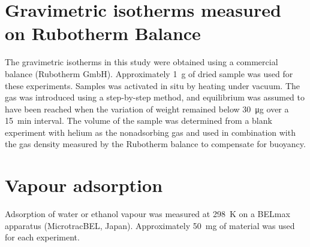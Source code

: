 \section{Gravimetric isotherms measured on Rubotherm Balance}

The gravimetric isotherms in this study were obtained 
using a commercial balance (Rubotherm GmbH). Approximately 
\SI{1}{\gram} of dried sample was used for these experiments. Samples was activated
in situ by heating under vacuum. 
The gas was introduced using a step-by-step method, and equilibrium was
assumed to have been reached when the variation of weight remained
below \SI{30}{\micro\gram} over a \SI{15}{\minute} interval. The volume of the sample was
determined from a blank experiment with helium as the nonadsorbing
gas and used in combination with the gas density measured by the
Rubotherm balance to compensate for buoyancy.

\section{Vapour adsorption}

Adsorption of water or ethanol vapour was measured at \SI{298}{\kelvin} on a BELmax apparatus
(MicrotracBEL, Japan). Approximately \SI{50}{\milli\gram} of material was used for each
experiment.
